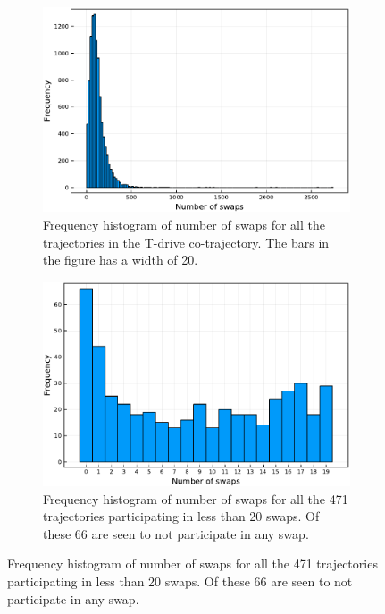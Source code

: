 \documentclass[12pt]{article}
\theoremstyle{definition}
\begin{document}
\begin{figure}
  \centering
  \begin{subfigure}[t]{0.49\textwidth}
    \includegraphics[width=\textwidth]{figures/numswaps-a.pdf}
    \caption{Frequency histogram of number of swaps for all the
      trajectories in the T-drive co-trajectory. The bars in the
      figure has a width of 20.}
    \label{fig:numswaps-a}
  \end{subfigure}
  \begin{subfigure}[t]{0.49\textwidth}
    \includegraphics[width=\textwidth]{figures/numswaps-b.pdf}
    \caption{Frequency histogram of number of swaps for all the 471
      trajectories participating in less than 20 swaps. Of these 66
      are seen to not participate in any swap.}
    \label{fig:numswaps-b}
  \end{subfigure}
  \label{fig:numswaps}
\end{figure}
\end{document}
